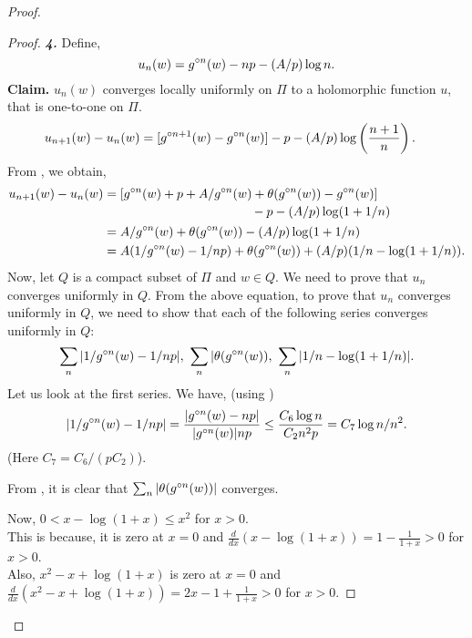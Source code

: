 \begin{proof}
\begin{proof}
\noindent\textbf{\emph{4.}} Define, \[
	u_n(w)=\gog[n](w)-np-(A /p)\log n
.\] 
\noindent\textbf{Claim.} \( u_n(w) \) converges locally uniformly on \( \Pi \) to a holomorphic function \( u \), that is one-to-one
on \( \Pi \).
\begin{align*}
	u_{n+1}(w)-u_n(w)&=[\gog[n+1](w)-\gog[n](w)]-p-(A /p)\log \left(\frac{n+1}{n}\right)
.\end{align*}
From , we obtain, 
\begin{align*}
	u_{n+1}(w)-u_n(w) &= \!\begin{multlined}[t]
							[\gog[n](w)+p+A /\gog[n](w)+\theta(\gog[n](w))-\gog[n](w)]\\
							 -p-(A /p)\log (1+1 /n)
						 \end{multlined}\\
					  &= A /\gog[n](w)+\theta (\gog[n](w))- (A /p)\log (1+1 /n)\\
					  &= A(1 /\gog[n](w)-1 /np)+\theta (\gog[n](w))+(A /p)(1 /n-\log (1+1 /n))
.\end{align*}
Now, let \( Q \) is a compact subset of \( \Pi \) and \( w\in Q \).
We need to prove that \( u_n \) converges uniformly in \( Q \). From the above equation, to prove
that \( u_n \) converges uniformly in \( Q \), we need to show that each of the following series converges uniformly in \( Q \):\[
	\sum_n |1 /\gog[n](w)-1 /np|,\,\,\sum_n|\theta (\gog[n](w)),\,\,\sum_n|1 /n-\log (1+1 /n)|
.\] 
Let us look at the first series. We have, (using ) \[
	|1 /\gog[n](w)-1 /np|=\frac{|\gog[n](w)-np|}{|\gog[n](w)|np}\le \frac{C_6 \log n}{C_2 n^2 p}=C_7\log n /n^2
.\] 
(Here \( C_7=C_6 /(pC_2) \)).

\noindent From , it is clear that \( \sum_n |\theta(\gog[n](w))| \) converges.

\noindent Now, \( 0<x-\log (1+x)\le   x^2 \) for \( x>0 \). \\
This is because, it is zero at \( x=0 \)
and \( \frac{d}{dx}(x-\log (1+x))=1-\frac{1}{1+x}>0 \) for \( x>0 \).\\
Also, \( x^2-x+\log (1+x) \) is zero at \( x=0 \) 
and \( \frac{d}{dx}(x^2-x+\log (1+x))=2x-1+\frac{1}{1+x}>0 \) for \( x>0 \).


\end{proof}
\end{proof}
